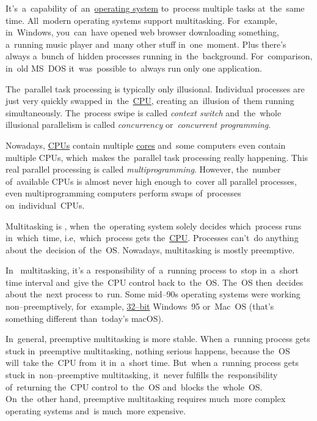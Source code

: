 \label{multitasking}
It's~a~capability of~an~\hyperref[os]{operating system} to~process multiple tasks at~the~same time.
All~modern operating systems support multitasking.
For~example, in~Windows, you~can~have opened web browser downloading something, a~running music player and~many other stuff in~one~moment.
Plus there's always a~bunch of~hidden processes running in~the~background.
For~comparison, in~old \mbox{MS DOS} it~was~possible to~always run only one application.

The~parallel task processing is typically only illusional.
Individual processes are just very quickly swapped in~the~\hyperref[processorcpucore]{CPU}, creating an~illusion of~them running simultaneously.
The~process swipe is called \textit{context switch} and~the~whole illusional parallelism is called \textit{concurrency} or~\textit{concurrent programming}.

Nowadays, \hyperref[processorcpucore]{CPUs} contain multiple \hyperref[processorcpucore]{cores} and~some computers even contain multiple CPUs, which~makes the~parallel task processing really happening.
This real parallel processing is called \textit{multiprogramming}.
However, the~number of~available CPUs is almost never high enough to~cover all parallel processes, even multiprogramming computers perform swaps of~processes on~individual~CPUs.
\newline

\label{preemption}
Multitasking is , when~the~operating system solely decides which~process runs in~which~time, i.e,~which~process gets the~\hyperref[processorcpucore]{CPU}.
Processes can't~do anything about the~decision of~the~OS\@.
Nowadays, multitasking is mostly preemptive.

In~ multitasking, it's a~responsibility of~a~running process to~stop in~a~short time interval and~give the~CPU control back to~the~OS\@.
The~OS then~decides about the~next process to~run.
Some mid--90s operating systems were working non--preemptively, for~example, \hyperref[32bvs64b]{32--bit} Windows~95 \mbox{or Mac OS} (that's something different \mbox{than today's} macOS).

In~general, preemptive multitasking is more stable.
When a~running process gets stuck in~preemptive multitasking, nothing serious happens, because the~OS will~take the~CPU from~it in~a~short time.
But~when a~running process gets stuck in~\mbox{non--preemptive} multitasking, it~never fulfills the~responsibility of~returning the~CPU control to~the~OS and~blocks the~whole~OS\@.
On~the~other hand, preemptive multitasking requires much~more complex operating systems and~is much~more expensive.
\newpage

